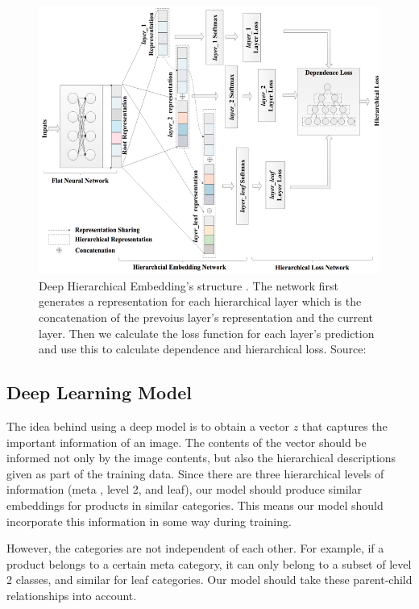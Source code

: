 \documentclass[conference]{IEEEtran}
\begin{document}
\begin{figure}[!t]
	\centering
	\includegraphics[scale=0.30]{network}
	\caption{Deep Hierarchical Embedding's structure . 
	The network first generates a representation for each hierarchical layer which is the concatenation
	of the prevoius layer's representation and the current layer. Then we calculate the loss
	function for each layer's prediction and use this to calculate dependence and hierarchical loss.
	Source:~\cite{gao2020deep}}
	\label{fig:network}
\end{figure}
\subsection{Deep Learning Model}
\label{sec:dlm}
The idea behind using a deep model is to obtain a vector $z$ that captures the important
information of an image.
The contents of the vector should be informed not only by the image contents, but also the 
hierarchical descriptions given as part of the training data.
Since there are three hierarchical levels of information (meta , level 2, and leaf),
our model should produce similar embeddings for products in similar categories.
This means our model should incorporate this information in some way during training.

However, the categories are not independent of each other.
For example, if a product belongs to a certain meta category, 
it can only belong to a subset of level 2 classes, and similar for 
leaf categories.
Our model should take these parent-child relationships into account.
\end{document}
